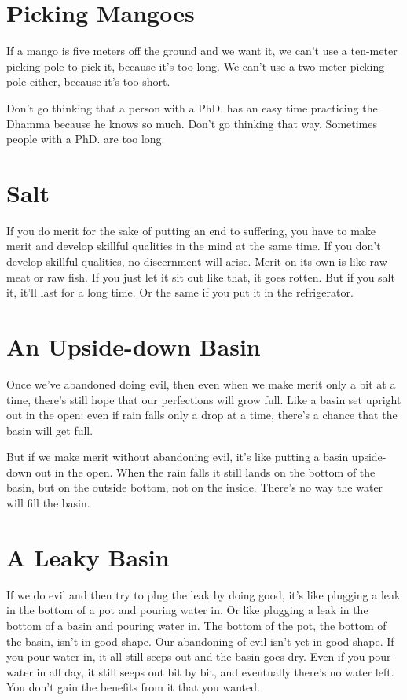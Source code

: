 \clearpage

\section{Picking Mangoes}

If a mango is five meters off the ground and we want it, we can't use a ten-meter picking pole to pick it, because it's too long. We can't use a two-meter picking pole either, because it's too short. 

Don't go thinking that a person with a PhD. has an easy time practicing the Dhamma because he knows so much. Don't go thinking that way. Sometimes people with a PhD. are too long. 

\section{Salt}

If you do merit for the sake of putting an end to suffering, you have to make merit and develop skillful qualities in the mind at the same time. If you don't develop skillful qualities, no discernment will arise. Merit on its own is like raw meat or raw fish. If you just let it sit out like that, it goes rotten. But if you salt it, it'll last for a long time. Or the same if you put it in the refrigerator.

\clearpage

\section{An Upside-down Basin}

Once we've abandoned doing evil, then even when we make merit only a bit at a time, there's still hope that our perfections will grow full. Like a basin set upright out in the open: even if rain falls only a drop at a time, there's a chance that the basin will get full.

But if we make merit without abandoning evil, it's like putting a basin upside-down out in the open. When the rain falls it still lands on the bottom of the basin, but on the outside bottom, not on the inside. There's no way the water will fill the basin.

\section{A Leaky Basin}

If we do evil and then try to plug the leak by doing good, it's like plugging a leak in the bottom of a pot and pouring water in. Or like plugging a leak in the bottom of a basin and pouring water in. The bottom of the pot, the bottom of the basin, isn't in good shape. Our abandoning of evil isn't yet in good shape. If you pour water in, it all still seeps out and the basin goes dry. Even if you pour water in all day, it still seeps out bit by bit, and eventually there's no water left. You don't gain the benefits from it that you wanted.

